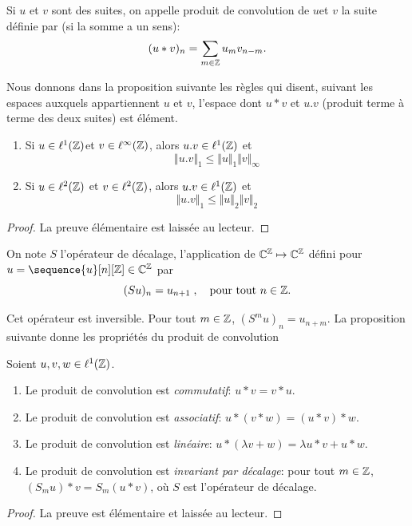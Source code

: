\begin{definition}
Si $u$ et $v$ sont des suites, on appelle produit de convolution de $u$et $v$ la suite d\'{e}finie par (si la somme a un sens):
$$
(u*v)_{n}=\sum_{m\in \mathbb{Z}}u_{m}v_{n-m}.
$$
\end{definition}
Nous donnons dans la proposition suivante les r\`{e}gles qui disent, suivant les espaces auxquels appartiennent $u$ et $v$, l'espace dont  $u*v$ et $u.v$ (produit terme \`{a} terme des deux suites) est \'el\'ement.

\begin{lemma}
\begin{enumerate}
\item Si $u\in \ell^1(\mathbb{Z})$et $v\in \ell^\infty(\mathbb{Z})$, alors $u.v\in \ell^1(\mathbb{Z})$ et
$$
\Vert u.v\Vert_{1}\leq\Vert u\Vert_{1}\Vert v\Vert_{\infty}
$$
\item Si $u\in \ell^2(\mathbb{Z})$ et $v\in \ell^2(\mathbb{Z})$, alors $u.v\in \ell^1(\mathbb{Z})$ et
$$
\Vert u.v\Vert_{1}\leq\Vert u\Vert_{2}\Vert v\Vert_{2}
$$
\end{enumerate}
\end{lemma}
\begin{proof}
La preuve \'el\'ementaire est laiss\'ee au lecteur.
\end{proof}

\begin{definition}
\label{def:operateur-decalage}
On note $S$ l'op\'erateur de décalage, l'application de $\mathbb{C}^{\mathbb{Z}} \mapsto \mathbb{C}^{\mathbb{Z}}$ défini pour  $u= \sequence{u}[n][\zset] \in \cset^{\zset}$ par
\begin{equation}
\label{eq:operateur-avance}
(S u)_n = u_{n+1} \;, \quad \text{pour tout $n \in \mathbb{Z}$}.
\end{equation}
\end{definition}
Cet opérateur est inversible. Pour tout $m \in \mathbb{Z}$, $(S^m u)_n= u_{n+m}$. 
La proposition suivante donne les propriétés du produit de convolution
\begin{proposition}
\label{prop:propriete-convolution}
Soient $u, v, w \in \ell^1(\mathbb{Z})$.
\begin{enumerate}[label=(\roman*)]
\item Le produit de convolution est \emph{commutatif}: $u * v= v * u$.
\item Le produit de convolution est \emph{associatif}: $u * (v * w)= (u * v)* w$.
\item Le produit de convolution est \emph{linéaire}: $u * (\lambda v + w)= \lambda u*v + u * w$.
\item Le produit de convolution est \emph{invariant par décalage}: pour tout $m \in \mathbb{Z}$, $(S_m u) * v = S_m (u * v)$, où $S$ est l'opérateur de décalage.
\end{enumerate}
\end{proposition}
\begin{proof}
La preuve est élémentaire et laissée au lecteur.
\end{proof}

